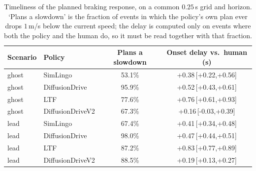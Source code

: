 \begin{table}[!tb]
\centering
\footnotesize
\setlength{\tabcolsep}{4pt}
\caption{Timeliness of the planned braking response, on a common $0.25$\,s grid and horizon. `Plans a slowdown' is the fraction of events in which the policy's own plan ever drops $1$\,m/s below the current speed; the delay is computed only on events where both the policy and the human do, so it must be read together with that fraction.}
\label{tab:timeliness}
\begin{tabular}{llcc}
\toprule
Scenario & Policy & Plans a slowdown & Onset delay vs.\ human (s)\\
\midrule
ghost & SimLingo & 53.1\% & +0.38\,[+0.22,+0.56]\\
ghost & DiffusionDrive & 95.9\% & +0.52\,[+0.43,+0.61]\\
ghost & LTF & 77.6\% & +0.76\,[+0.61,+0.93]\\
ghost & DiffusionDriveV2 & 67.3\% & +0.16\,[-0.03,+0.39]\\
\midrule
lead & SimLingo & 67.4\% & +0.41\,[+0.34,+0.48]\\
lead & DiffusionDrive & 98.0\% & +0.47\,[+0.44,+0.51]\\
lead & LTF & 87.2\% & +0.83\,[+0.77,+0.89]\\
lead & DiffusionDriveV2 & 88.5\% & +0.19\,[+0.13,+0.27]\\
\bottomrule
\end{tabular}
\end{table}
